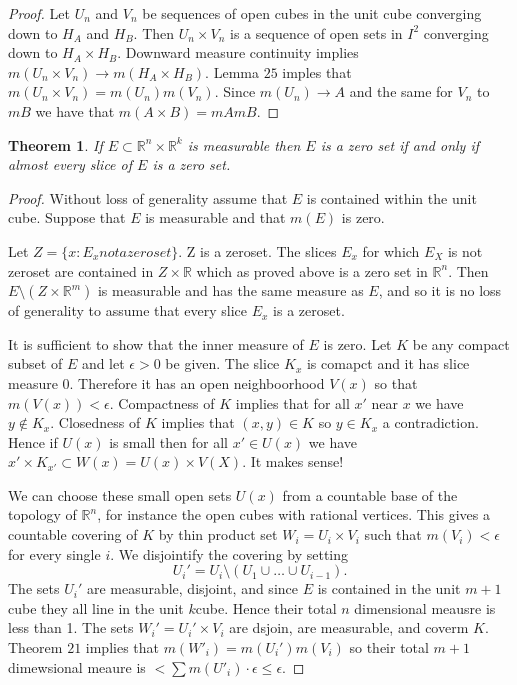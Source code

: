 \documentclass[letter]{article}
\newtheorem{theorem}{Theorem}
\newenvironment{menumerate}{%
  \edef\backupindent{\the\parindent}%
  \enumerate%
  \setlength{\parindent}{\backupindent}%
}{\endenumerate}
\begin{document}
\begin{menumerate}
\begin{proof}
           Let $U_n$ and $V_n$ be sequences of open cubes in the unit cube converging down to $H_A$ and $H_B.$
           Then $U_n \times V_n$ is a sequence of open sets in $I^2$ converging down to $H_A \times H_B$. Downward 
           measure continuity implies $m(U_n \times V_n) \to m(H_A \times H_B).$ Lemma $25$ imples that
           $m(U_n \times V_n) = m(U_n)m(V_n).$ Since $m(U_n) \to A$ and the same for $V_n$ to $mB$ we have that
           $m(A \times B) = mAmB.$
    \end{proof}
    \begin{theorem}
        If $E \subset \mathbb{R}^n \times \mathbb{R}^k$ is measurable then $E$ is a zero set if and only if almost every slice of $E$ is
        a zero set.
    \end{theorem}
    \begin{proof}
        Without loss of generality assume that $E$ is contained within the unit cube. Suppose that $E$ is measurable
        and that $m(E)$ is zero.

        Let $Z = \{x : E_x not a zeroset \}.$ Z is a zeroset. The slices $E_x$ for which $E_X$ is not zeroset are contained
        in $Z \times \mathbb{R}$ which as proved above is a zero set in $\mathbb{R}^n$. Then $E \setminus (Z \times \mathbb{R}^m)$
        is measurable and has the same measure as $E$, and so it is no loss of generality to assume that every slice $E_x$
        is a zeroset.

        It is sufficient to show that the inner measure of $E$ is zero. Let $K$ be any compact subset of $E$ and let $\epsilon >0$
        be given. The slice $K_x$ is comapct and it has slice measure $0.$ Therefore it has an open neighboorhood $V(x)$
        so that $m(V(x)) < \epsilon$. Compactness of $K$ implies that for all $x'$ near $x$ we have $y \notin K_x.$ Closedness
        of $K$ implies that $(x,y) \in K$ so $y \in K_x$ a contradiction. Hence if $U(x)$ is small then for all $x' \in U(x)$
        we have $x' \times K_{x'}\subset W(x) = U(x) \times V(X).$ It makes sense!

        We can choose these small open sets $U(x)$ from a countable base of the topology of $\mathbb{R}^n$, for instance the open 
        cubes with rational vertices. This gives a countable covering of $K$ by thin product set $W_i = U_i \times V_i$ such that
        $m(V_i) < \epsilon$ for every single $i.$ We disjointify the covering by setting
        \begin{equation}
            U_i' = U_i \setminus (U_1 \cup \dots \cup U_{i-1}).
        \end{equation}
        The sets $U_i'$ are measurable, disjoint, and since $E$ is contained in the unit $m+1$ cube they all line in the unit $k$cube.
        Hence their total $n$ dimensional meausre is less than 1. The sets $W_i' = U_i' \times V_i$ are dsjoin, are measurable, and coverm $K.$
        Theorem $21$ implies that $m(W'_i) = m(U_i')m(V_i)$ so their total $m+1$ dimewsional meaure is $< \sum m(U'_i)\cdot \epsilon \leq \epsilon.$


\end{proof}
\end{menumerate}
\end{document}
